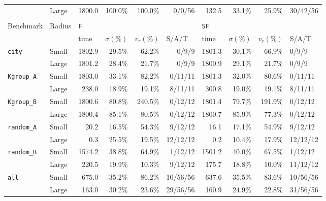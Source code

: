 \begin{table}[]
{\begin{tabular}{|l|l|*{4}{r}|*{4}{r}}
&Large & 1800.0 & 100.0\% & 100.0\% & 0/0/56 & 132.5 & 33.1\% & 25.9\% & \multicolumn{1}{l|}{30/42/56} \\
 \cline{1-10}
\multicolumn{10}{c}{}\\
\cline{1-10}
\multirow{2}{*}{Benchmark} & \multirow{2}{*}{Radius} & \multicolumn{4}{l|}{\texttt{F}}                                                                                 	& \multicolumn{4}{l|}{\texttt{SF}}                                                                                                    	\\ \cline{3-10}
                       	& & \multicolumn{1}{l|}{time} & \multicolumn{1}{l|}{$\sigma(\%)$} & \multicolumn{1}{l|}{$v_r(\%)$} & \multicolumn{1}{l|}{S/A/T} & \multicolumn{1}{l|}{time} & \multicolumn{1}{l|}{$\sigma(\%)$} & \multicolumn{1}{l|}{$v_r(\%)$} & \multicolumn{1}{l|}{S/A/T}  \\ \hline
\multirow{2}{*}{\texttt{city}}&Small & 1802.9 & 29.5\% & 62.2\% & 0/9/9 & 1801.3 & 30.1\% & 66.9\% & \multicolumn{1}{l|}{0/9/9} \\
&Large & 1801.2 & 28.4\% & 21.7\% & 0/9/9 & 1800.9 & 29.1\% & 21.7\% & \multicolumn{1}{l|}{0/9/9} \\  \cline{1-1}
\multirow{2}{*}{\texttt{Kgroup\_A}}&Small & 1803.0 & 33.1\% & 82.2\% & 0/11/11 & 1801.3 & 32.0\% & 80.6\% & \multicolumn{1}{l|}{0/11/11} \\
&Large & 238.0 & 18.9\% & 19.1\% & 8/11/11 & 300.8 & 19.0\% & 19.1\% & \multicolumn{1}{l|}{8/11/11} \\  \cline{1-1}
\multirow{2}{*}{\texttt{Kgroup\_B}}&Small & 1800.6 & 80.8\% & 240.5\% & 0/12/12 & 1801.4 & 79.7\% & 191.9\% & \multicolumn{1}{l|}{0/12/12} \\
&Large & 1800.4 & 85.1\% & 80.5\% & 0/12/12 & 1800.7 & 85.9\% & 77.3\% & \multicolumn{1}{l|}{0/12/12} \\  \cline{1-1}
\multirow{2}{*}{\texttt{random\_A}}&Small & 20.2 & 16.5\% & 54.3\% & 9/12/12 & 16.1 & 17.1\% & 54.9\% & \multicolumn{1}{l|}{9/12/12} \\
&Large & 0.3 & 25.5\% & 19.5\% & 12/12/12 & 0.2 & 10.4\% & 17.9\% & \multicolumn{1}{l|}{12/12/12} \\  \cline{1-1}
\multirow{2}{*}{\texttt{random\_B}}&Small & 1574.2 & 38.8\% & 64.9\% & 1/12/12 & 1501.2 & 40.0\% & 67.5\% & \multicolumn{1}{l|}{1/12/12} \\
&Large & 220.5 & 19.9\% & 10.3\% & 9/12/12 & 175.7 & 18.8\% & 10.0\% & \multicolumn{1}{l|}{11/12/12} \\  \cline{1-10}
\multirow{2}{*}{\texttt{all}}&Small & 675.0 & 35.2\% & 86.2\% & 10/56/56 & 637.6 & 35.5\% & 83.6\% & \multicolumn{1}{l|}{10/56/56} \\
&Large & 163.0 & 30.2\% & 23.6\% & 29/56/56 & 160.9 & 24.9\% & 22.8\% & \multicolumn{1}{l|}{31/56/56} \\


\end{tabular}}
\end{table}
